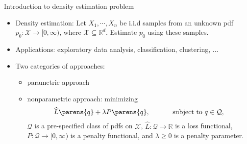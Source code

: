 \documentclass[aspectratio=169,xcolor=dvipsnames]{beamer}
\newcommand{\calX}{\mathcal{X}}
\newcommand{\Real}{\mathbb{R}}
\begin{document}
\begin{frame}{Introduction to density estimation problem}
	
	\begin{itemize}
		\item {\color{defaultcolor}Density estimation:} Let $X_1, \cdots, X_n$ be i.i.d samples from an unknown pdf $p_0: \calX \to [0, \infty)$, where $\calX \subseteq \Real^d$. Estimate $p_0$ using these samples. 
		
		\vspace{7pt}
		
		\item {\color{defaultcolor}Applications:} exploratory data analysis, classification, clustering, ... 

		\vspace{7pt}
		
		\item {\color{defaultcolor}Two categories of approaches:} 
		\begin{itemize}
			\item parametric approach
			\item nonparametric approach: minimizing 
			\begin{align*}
				\widehat{L} \parens{q} + \lambda P \parens{q}, \qquad \quad \text{ subject to } q \in \mathcal{Q}, 
			\end{align*} 
			$\mathcal{Q}$ is a pre-specified class of pdfs on $\mathcal{X}$, $\widehat{L}: \mathcal{Q} \to \mathbb{R}$ is a loss functional, $P: \mathcal{Q} \to [0, \infty)$ is a penalty functional, and $\lambda \ge 0$ is a penalty parameter. 
		\end{itemize}
	\end{itemize}
	
\end{frame}
\end{document}
